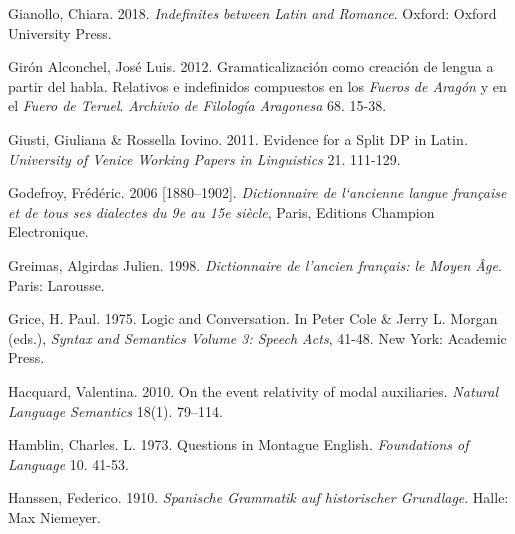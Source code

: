 \begin{styleStandard}
Gianollo, Chiara. 2018. \textit{Indefinites between Latin and Romance}. Oxford: Oxford University Press.
\end{styleStandard}

\begin{styleStandard}
Girón Alconchel, José Luis. 2012. Gramaticalización como creación de lengua a partir del habla. Relativos e indefinidos compuestos en los \textit{Fueros de Aragón }y en el \textit{Fuero de Teruel}. \textit{Archivio de Filología Aragonesa} 68. 15-38.
\end{styleStandard}

\begin{styleStandard}
Giusti, Giuliana \& Rossella Iovino. 2011. Evidence for a Split DP in Latin\textit{. University of Venice Working Papers in Linguistics} 21. 111-129.
\end{styleStandard}

\begin{styleStandard}
Godefroy, Frédéric. 2006 [1880–1902]. \textit{Dictionnaire de l‘ancienne langue française et de tous ses dialectes du 9e au 15e siècle}, Paris, Editions Champion Electronique.
\end{styleStandard}

\begin{styleStandard}
Greimas, Algirdas Julien. 1998. \textit{Dictionnaire de l’ancien français: le Moyen Âge}. Paris: Larousse.
\end{styleStandard}

\begin{styleStandard}
Grice, H. Paul. 1975. Logic and Conversation. In Peter Cole \& Jerry L. Morgan (eds.), \textit{Syntax and Semantics Volume 3: Speech Acts}, 41-48. New York: Academic Press.
\end{styleStandard}

\begin{styleStandard}
Hacquard, Valentina. 2010. On the event relativity of modal auxiliaries. \textit{Natural Language Semantics} 18(1). 79–114.
\end{styleStandard}

\begin{styleStandard}
Hamblin, Charles. L. 1973. Questions in Montague English. \textit{Foundations of Language }10. 41-53.
\end{styleStandard}

\begin{styleLiteraturStandard}
Hanssen, Federico. 1910. \textit{Spanische Grammatik auf historischer Grundlage}. Halle: Max Niemeyer.
\end{styleLiteraturStandard}

